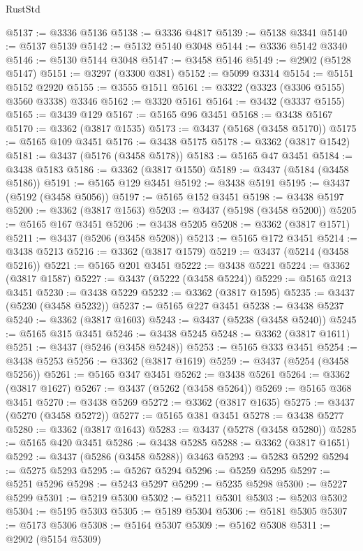 \begin{lexlean}{RustStd}
\begin{coremodule}
@5137 := @3336 @5136
@5138 := @3336 @4817
@5139 := @5138 @3341
@5140 := @5137 @5139
@5142 := @5132 @5140 @3048
@5144 := @3336 @5142 @3340
@5146 := @5130 @5144 @3048
@5147 := @3458 @5146
@5149 := @2902 (@5128 @5147)
@5151 := @3297 (@3300 @381)
@5152 := @5099 @3314
@5154 := @5151 @5152 @2920
@5155 := @3555 @1511
@5161 := @3322 (@3323 (@3306 @5155) @3560 @3338) @3346
@5162 := @3320 @5161
@5164 := @3432 (@3337 @5155)
@5165 := @3439 @129
@5167 := @5165 @96 @3451
@5168 := @3438 @5167
@5170 := @3362 (@3817 @1535)
@5173 := @3437 (@5168 (@3458 @5170))
@5175 := @5165 @109 @3451
@5176 := @3438 @5175
@5178 := @3362 (@3817 @1542)
@5181 := @3437 (@5176 (@3458 @5178))
@5183 := @5165 @47 @3451
@5184 := @3438 @5183
@5186 := @3362 (@3817 @1550)
@5189 := @3437 (@5184 (@3458 @5186))
@5191 := @5165 @129 @3451
@5192 := @3438 @5191
@5195 := @3437 (@5192 (@3458 @5056))
@5197 := @5165 @152 @3451
@5198 := @3438 @5197
@5200 := @3362 (@3817 @1563)
@5203 := @3437 (@5198 (@3458 @5200))
@5205 := @5165 @167 @3451
@5206 := @3438 @5205
@5208 := @3362 (@3817 @1571)
@5211 := @3437 (@5206 (@3458 @5208))
@5213 := @5165 @172 @3451
@5214 := @3438 @5213
@5216 := @3362 (@3817 @1579)
@5219 := @3437 (@5214 (@3458 @5216))
@5221 := @5165 @201 @3451
@5222 := @3438 @5221
@5224 := @3362 (@3817 @1587)
@5227 := @3437 (@5222 (@3458 @5224))
@5229 := @5165 @213 @3451
@5230 := @3438 @5229
@5232 := @3362 (@3817 @1595)
@5235 := @3437 (@5230 (@3458 @5232))
@5237 := @5165 @227 @3451
@5238 := @3438 @5237
@5240 := @3362 (@3817 @1603)
@5243 := @3437 (@5238 (@3458 @5240))
@5245 := @5165 @315 @3451
@5246 := @3438 @5245
@5248 := @3362 (@3817 @1611)
@5251 := @3437 (@5246 (@3458 @5248))
@5253 := @5165 @333 @3451
@5254 := @3438 @5253
@5256 := @3362 (@3817 @1619)
@5259 := @3437 (@5254 (@3458 @5256))
@5261 := @5165 @347 @3451
@5262 := @3438 @5261
@5264 := @3362 (@3817 @1627)
@5267 := @3437 (@5262 (@3458 @5264))
@5269 := @5165 @368 @3451
@5270 := @3438 @5269
@5272 := @3362 (@3817 @1635)
@5275 := @3437 (@5270 (@3458 @5272))
@5277 := @5165 @381 @3451
@5278 := @3438 @5277
@5280 := @3362 (@3817 @1643)
@5283 := @3437 (@5278 (@3458 @5280))
@5285 := @5165 @420 @3451
@5286 := @3438 @5285
@5288 := @3362 (@3817 @1651)
@5292 := @3437 (@5286 (@3458 @5288)) @3463
@5293 := @5283 @5292
@5294 := @5275 @5293
@5295 := @5267 @5294
@5296 := @5259 @5295
@5297 := @5251 @5296
@5298 := @5243 @5297
@5299 := @5235 @5298
@5300 := @5227 @5299
@5301 := @5219 @5300
@5302 := @5211 @5301
@5303 := @5203 @5302
@5304 := @5195 @5303
@5305 := @5189 @5304
@5306 := @5181 @5305
@5307 := @5173 @5306
@5308 := @5164 @5307
@5309 := @5162 @5308
@5311 := @2902 (@5154 @5309)

\end{coremodule}
\end{lexlean}
